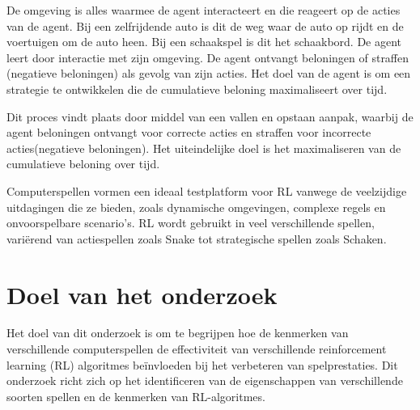 \documentclass[a4paper,11pt]{report}
\begin{document}
\noindent
\begin{minipage}[t]{0.65\textwidth}
    \vspace{-6.5\baselineskip}
    De omgeving is alles waarmee de agent interacteert en die reageert op de acties van
    de agent. Bij een zelfrijdende auto is dit de weg waar de auto op rijdt en de
    voertuigen om de auto heen. Bij een schaakspel is dit het schaakbord. De agent
    leert door interactie met zijn omgeving. De agent ontvangt beloningen of
    straffen (negatieve beloningen) als gevolg van zijn acties. Het doel van de
    agent is om een strategie te ontwikkelen die de cumulatieve beloning
    maximaliseert over tijd.
\end{minipage}
\hfill %
\begin{minipage}[t]{0.3\textwidth} %
    \centering
    \label{fig:rl_model}
\end{minipage}

Dit proces vindt plaats door middel van een vallen en opstaan aanpak, waarbij
de agent beloningen ontvangt voor correcte acties en straffen voor incorrecte
acties(negatieve beloningen). Het uiteindelijke doel is het maximaliseren van
de cumulatieve beloning over tijd.

Computerspellen vormen een ideaal testplatform voor RL vanwege de veelzijdige
uitdagingen die ze bieden, zoals dynamische omgevingen, complexe regels en
onvoorspelbare scenario’s. RL wordt gebruikt in veel verschillende spellen,
variërend van actiespellen zoals Snake tot strategische spellen zoals Schaken.

\section{Doel van het onderzoek}
Het doel van dit onderzoek is om te begrijpen hoe de kenmerken van
verschillende computerspellen de effectiviteit van verschillende reinforcement
learning (RL) algoritmes beïnvloeden bij het verbeteren van spelprestaties. Dit
onderzoek richt zich op het identificeren van de eigenschappen van
verschillende soorten spellen en de kenmerken van RL-algoritmes.
\end{document}
